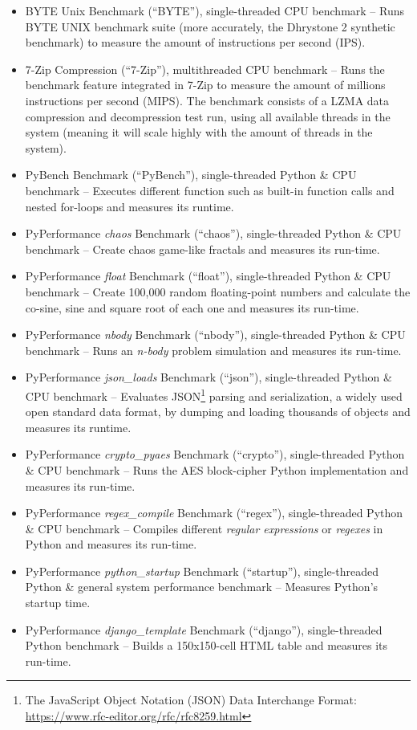 \begin{itemize}
    \item BYTE Unix Benchmark (``BYTE''), single-threaded \acs{CPU} benchmark -- Runs BYTE UNIX benchmark suite (more accurately, the Dhrystone 2 synthetic benchmark) to measure the amount of instructions per second (IPS). 
    \item 7-Zip Compression (``7-Zip''), multithreaded \acs{CPU} benchmark -- Runs the benchmark feature integrated in 7-Zip to measure the amount of millions instructions per second (MIPS). The benchmark consists of a LZMA data compression and decompression test run, using all available threads in the system (meaning it will scale highly with the amount of threads in the system). 
    \item PyBench Benchmark (``PyBench''), single-threaded Python \& \acs{CPU} benchmark -- Executes different function such as built-in function calls and nested for-loops and measures its runtime.
    \item PyPerformance \textit{chaos} Benchmark (``chaos''), single-threaded Python \& \acs{CPU} benchmark -- Create chaos game-like fractals \cite{Jeffrey1992} and measures its run-time. 
    \item PyPerformance \textit{float} Benchmark (``float''), single-threaded Python \& \acs{CPU} benchmark -- Create 100,000 random floating-point numbers and calculate the co-sine, sine and square root of each one and measures its run-time.
    \item PyPerformance \textit{nbody} Benchmark (``nbody''), single-threaded Python \& \acs{CPU} benchmark -- Runs an \textit{n-body} problem simulation \cite{Playne2009} and measures its run-time.
    \item PyPerformance \textit{json\_loads} Benchmark (``json''), single-threaded Python \& \acs{CPU} benchmark -- Evaluates \acf{JSON}\footnote{The JavaScript Object Notation (JSON) Data Interchange Format: \url{https://www.rfc-editor.org/rfc/rfc8259.html}} parsing and serialization, a widely used open standard data format, by dumping and loading thousands of objects and measures its runtime.
    \item PyPerformance \textit{crypto\_pyaes} Benchmark (``crypto''), single-threaded Python \& \acs{CPU} benchmark -- Runs the AES block-cipher Python implementation and measures its run-time.
    \item PyPerformance \textit{regex\_compile} Benchmark (``regex''), single-threaded Python \& \acs{CPU} benchmark -- Compiles different \textit{regular expressions} or \textit{regexes} in Python and measures its run-time.
    \item PyPerformance \textit{python\_startup} Benchmark (``startup''), single-threaded Python \& general system performance benchmark -- Measures Python's startup time.
    \item PyPerformance \textit{django\_template} Benchmark (``django''), single-threaded Python benchmark -- Builds a 150x150-cell HTML table and measures its run-time.
\end{itemize}

